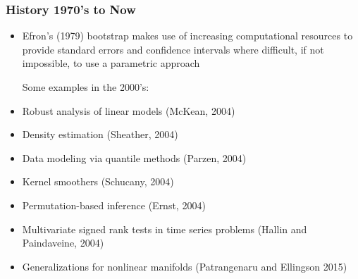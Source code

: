\documentclass[10pt]{beamer}
\begin{document}
\begin{frame}
\frametitle{History 1970's to Now}

\begin{itemize}
\item Efron's (1979) bootstrap makes use of increasing computational resources to provide standard errors and confidence intervals where  difficult, if not impossible, to use a parametric approach \newline

Some examples in the 2000's:
\item Robust analysis of linear models (McKean, 2004)
\item Density estimation (Sheather, 2004)
\item Data modeling via quantile methods (Parzen, 2004)
\item Kernel smoothers (Schucany, 2004)
\item Permutation-based inference (Ernst, 2004) 
\item Multivariate signed rank tests in time series problems (Hallin and Paindaveine, 2004)
\item Generalizations for nonlinear manifolds (Patrangenaru and Ellingson 2015)
\end{itemize}

\end{frame}
\end{document}
